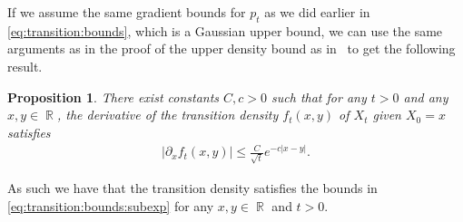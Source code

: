 \documentclass[11pt,reqno,a4paper]{amsart}
\newtheorem{proposition}[theorem]{Proposition}
\theoremstyle{definition}
\numberwithin{equation}{section}
\DeclareMathOperator{\R}{\mathbb{R}}
\DeclareMathOperator{\1}{\mathbbm{1}}
\begin{document}
If we assume the same gradient bounds for $p_t$ as we did earlier in \cref{eq:transition:bounds}, which is a Gaussian upper bound, we can use the same arguments as in the proof of the upper density bound as in~\cite{kohatsu2022density} to get the following result.

\begin{proposition} \label{prop:jumpdiffusion:bounds}
  There exist constants $C, c > 0$ such that for any $t > 0$ and any $x,y \in \R$, the derivative of the transition density $f_t(x,y)$ of $X_{t}$ given $X_0 = x$ satisfies
  \begin{align*}
    |\partial_x f_t(x,y)| \leq \frac{C}{\sqrt{t}} e^{- c|x-y| }.
  \end{align*}
\end{proposition}

As such we have that the transition density satisfies the bounds in \cref{eq:transition:bounds:subexp} for any $x,y \in \R$ and $t > 0$.
\end{document}
